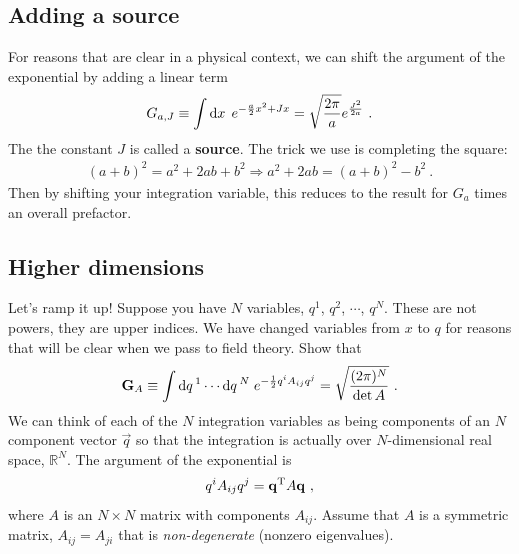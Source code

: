 \documentclass[12pt, oneside]{report}    %
\begin{document}
\subsection{Adding a source}
For reasons that are clear in a physical context, we can shift the argument of the exponential by adding a linear term
\begin{align}
    G_{a,J} \equiv \int \D{x}\; e^{-\frac{a}{2}x^2 + Jx} = \sqrt{\frac{2\pi}{a}}  e^{\frac{J^2}{2a}} \ .
    \label{eq:Gaussian:with:source}
\end{align}
The the constant $J$ is called a \textbf{source}. The trick we use is completing the square:
\begin{align}
    (a+b)^2 = a^2 + 2ab + b^2 \Rightarrow a^2 + 2ab = (a+b)^2 - b^2 \ .
\end{align}
Then by shifting your integration variable, this reduces to the result for $G_a$ times an overall prefactor.


\subsection{Higher dimensions}
Let's ramp it up! Suppose you have $N$ variables, $q^1$, $q^2$, $\cdots$, $q^N$. These are not powers, they are upper indices. We have changed variables from $x$ to $q$ for reasons that will be clear when we pass to field theory.
Show that
\begin{align} 
    \mathbf{G}_A
    \equiv \int \D{q}^1\cdots \D{q}^N\; e^{-\frac{1}{2} q^i A_{ij} q^j} 
    = \sqrt{\frac{(2\pi)^N}{\det A}} \ .
    \label{eq:GA:Gaussian}
\end{align}
We can think of each of the $N$ integration variables as being components of an $N$ component vector $\vec{q}$ so that the integration is actually over $N$-dimensional real space, $\mathbb{R}^N$. The argument of the exponential is
\begin{align}
    q^i A_{ij} q^j = \vec{q}^\textnormal{T} A \vec{q} \ ,
\end{align}
where $A$ is an $N\times N$ matrix with components $A_{ij}$. Assume that $A$ is a symmetric matrix, $A_{ij} = A_{ji}$ that is \emph{non-degenerate} (nonzero eigenvalues).
\end{document}
